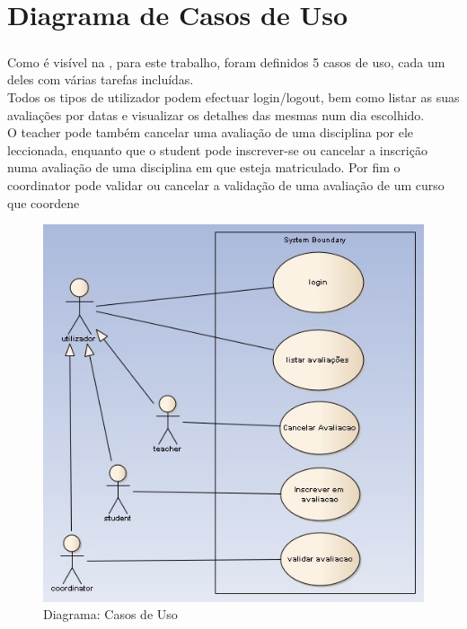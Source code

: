\chapter{Diagrama de Casos de Uso}

\paragraph{}

Como é visível na , para este trabalho, foram definidos 5 casos de uso, cada um deles com várias tarefas incluídas.\\
Todos os tipos de utilizador podem efectuar login/logout, bem como listar as suas avaliações por datas e visualizar os detalhes das mesmas num dia escolhido.\\
O teacher pode também cancelar uma avaliação de uma disciplina por ele leccionada, enquanto que o student pode inscrever-se ou cancelar a inscrição numa avaliação de uma disciplina em que esteja matriculado. Por fim o coordinator pode validar ou cancelar a validação de uma avaliação de um curso que coordene

\begin{figure}[!htbp]
\centering
\includegraphics{imagens/casos_de_uso.jpg}
\caption{Diagrama: Casos de Uso}
\label{fig:casos_de_uso}
\end{figure}

